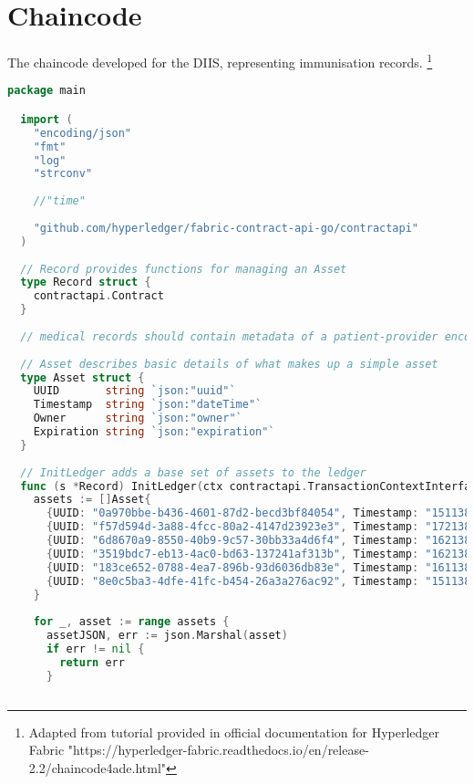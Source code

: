 \section{Chaincode} 
The chaincode developed for the DIIS, representing immunisation records. \footnote{Adapted from tutorial provided in official documentation for Hyperledger Fabric "https://hyperledger-fabric.readthedocs.io/en/release-2.2/chaincode4ade.html"} \label{appendix:chaincode}
\begin{lstlisting}[language=Go, caption={Chaincode representing immunisation records.}]
  package main

  import (
    "encoding/json"
    "fmt"
    "log"
    "strconv"
  
    //"time"
  
    "github.com/hyperledger/fabric-contract-api-go/contractapi"
  )
  
  // Record provides functions for managing an Asset
  type Record struct {
    contractapi.Contract
  }
  
  // medical records should contain metadata of a patient-provider encounter (visit date/time, location, etc.),
  
  // Asset describes basic details of what makes up a simple asset
  type Asset struct {
    UUID       string `json:"uuid"`
    Timestamp  string `json:"dateTime"`
    Owner      string `json:"owner"`
    Expiration string `json:"expiration"`
  }
  
  // InitLedger adds a base set of assets to the ledger
  func (s *Record) InitLedger(ctx contractapi.TransactionContextInterface) error {
    assets := []Asset{
      {UUID: "0a970bbe-b436-4601-87d2-becd3bf84054", Timestamp: "1511382400000", Owner: "Jane Doe", Expiration: "1655510400000"}, // add an attribute for Immunisation, representing the disesase + variant?
      {UUID: "f57d594d-3a88-4fcc-80a2-4147d23923e3", Timestamp: "1721382400000", Owner: "Ajay Singh", Expiration: "1655510400000"},
      {UUID: "6d8670a9-8550-40b9-9c57-30bb33a4d6f4", Timestamp: "1621382402100", Owner: "Zhang San", Expiration: "1655510400000"},
      {UUID: "3519bdc7-eb13-4ac0-bd63-137241af313b", Timestamp: "1621382448000", Owner: "Max Mustermann", Expiration: "1655510400000"},
      {UUID: "183ce652-0788-4ea7-896b-93d6036db83e", Timestamp: "1611382409500", Owner: "Pierre Paul", Expiration: "1655510400000"},
      {UUID: "8e0c5ba3-4dfe-41fc-b454-26a3a276ac92", Timestamp: "1511382400120", Owner: "Wang Wu", Expiration: "1655510400000"},
    }
  
    for _, asset := range assets {
      assetJSON, err := json.Marshal(asset)
      if err != nil {
        return err
      }
  

\end{lstlisting}

